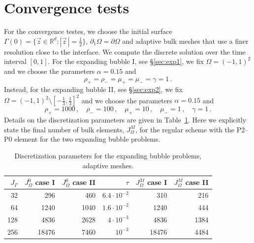 \documentclass[a4paper,12pt,onecolumn]{article}
\newcommand{\R}{\mathbb R}
\begin{document}
\section{Convergence tests}\label{sec:ns_convergence_results}
For the convergence testes, we choose the initial surface $\Gamma(0) = \{ \vec
z \in \R^d : |\vec z\,| = \frac12 \}$, $\partial_1\Omega=\partial\Omega$ and
adaptive bulk meshes that use a finer resolution close to the interface. We
compute the discrete solution over the time interval $[0,1]$. For the expanding
bubble I, see \S\ref{sec:exp1}, we fix $\Omega = (-1,1)^2$ and we choose the
parameters $\alpha =0.15$ and
\begin{equation}
\rho_+ = \rho_- = \mu_+ = \mu_- = \gamma = 1\,.
\end{equation}
Instead, for the expanding bubble II, see \S\ref{sec:exp2}, we fix
$\Omega = (-1,1)^2 \setminus[-\frac13,\frac13]^2$ and we choose the parameters
$\alpha=0.15$ and
\begin{equation}
\rho_+ = 1000\,,\quad \rho_- = 100\,,\quad \mu_+ = 10\,,\quad \mu_- = 1\,,\quad
\gamma = 1\,.
\end{equation}
Details on the discretization parameters are given in
Table~\ref{tab:nsexpandingbubbleelements}. Here we explicitly state the final
number of bulk elements, $J_\Omega^M$, for the regular scheme with the P2--P0
element for the two expanding bubble problems.
\begin{table}
\center
\begin{tabular}{rrrrrr}
\hline
$J_\Gamma$ & $J_\Omega^0$ case I & $J_\Omega^0$ case II & $\tau$ &
$J_\Omega^M$ case I & $J_\Omega^M$ case II\\
\hline
 32 &   296 &  460 & $6.4\cdot10^{-2}$ &   310 &  216 \\
 64 &  1240 & 1040 & $1.6\cdot10^{-2}$ &  1240 &  444 \\
128 &  4836 & 2628 &   $4\cdot10^{-3}$ &  4836 & 1384 \\
256 & 18476 & 7460 &         $10^{-3}$ & 18476 & 4484 \\
\hline
\end{tabular}
\caption[Navier--Stokes expanding bubble meshes parameters]
{Discretization parameters for the expanding bubble problems, adaptive meshes.}
\label{tab:nsexpandingbubbleelements}
\end{table}
\end{document}
